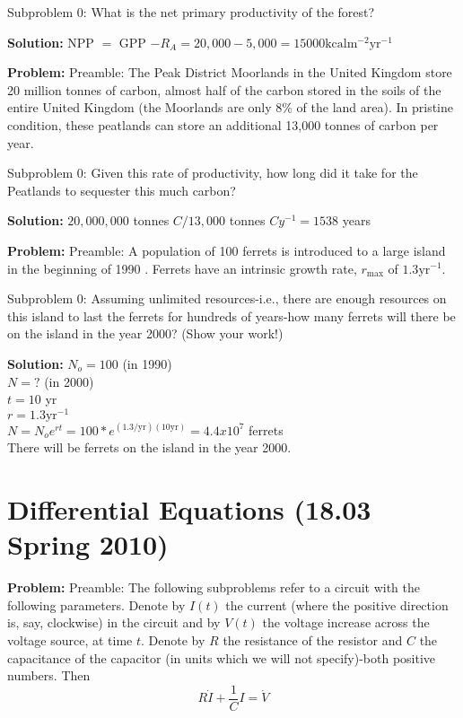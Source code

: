 \documentclass[10pt]{article}
\begin{document}
Subproblem 0: What is the net primary productivity of the forest?


\textbf{Solution:}
NPP $=$ GPP $-R_{A}=20,000-5,000=\boxed{15000} \mathrm{kcal} \mathrm{m}^{-2} \mathrm{yr}^{-1}$


\textbf{Problem:}
Preamble: The Peak District Moorlands in the United Kingdom store 20 million tonnes of carbon, almost half of the carbon stored in the soils of the entire United Kingdom (the Moorlands are only $8 \%$ of the land area). In pristine condition, these peatlands can store an additional 13,000 tonnes of carbon per year.

Subproblem 0: Given this rate of productivity, how long did it take for the Peatlands to sequester this much carbon?


\textbf{Solution:}
$20,000,000$ tonnes $C / 13,000$ tonnes $C y^{-1}=\boxed{1538}$ years


\textbf{Problem:}
Preamble: A population of 100 ferrets is introduced to a large island in the beginning of 1990 . Ferrets have an intrinsic growth rate, $r_{\max }$ of $1.3 \mathrm{yr}^{-1}$.

Subproblem 0: Assuming unlimited resources-i.e., there are enough resources on this island to last the ferrets for hundreds of years-how many ferrets will there be on the island in the year 2000? (Show your work!)


\textbf{Solution:}
$N_o = 100$ (in 1990)
\\
$N = ?$ (in 2000)
\\
$t = 10$ yr
\\
$r = 1.3 \text{yr}^{-1}$
\\
$N = N_{o}e^{rt} = 100*e^{(1.3/\text{yr})(10 \text{yr})} = 4.4 x 10^7$ ferrets
\\
There will be  ferrets on the island in the year 2000. 


\section{Differential Equations (18.03 Spring 2010)}

\textbf{Problem:}
Preamble: The following subproblems refer to a circuit with the following parameters. Denote by $I(t)$ the current (where the positive direction is, say, clockwise) in the circuit and by $V(t)$ the voltage increase across the voltage source, at time $t$. Denote by $R$ the resistance of the resistor and $C$ the capacitance of the capacitor (in units which we will not specify)-both positive numbers. Then
\[
R \dot{I}+\frac{1}{C} I=\dot{V}
\]
\end{document}
